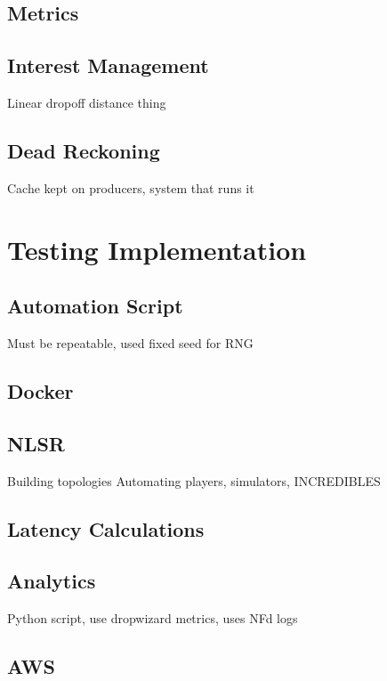 \subsection{Metrics}

\subsection{Interest Management}\label{sec:impl:im}
Linear dropoff distance thing

\subsection{Dead Reckoning}\label{sec:des:dr}
Cache kept on producers, system that runs it

\section{Testing Implementation}
\subsection{Automation Script}
Must be repeatable, used fixed seed for RNG

\subsection{Docker}


\subsection{NLSR}
Building topologies
Automating players, simulators, INCREDIBLES


\subsection{Latency Calculations}


\subsection{Analytics}
Python script, use dropwizard metrics, uses NFd logs


\subsection{AWS}


